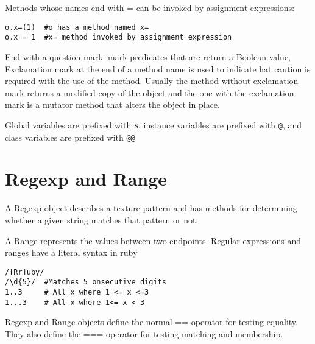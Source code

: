\documentclass[11pt, a4paper]{book}
\begin{document}
Methods whose names end with = can be invoked by assignment expressions:
\begin{verbatim}
o.x=(1)  #o has a method named x=
o.x = 1  #x= method invoked by assignment expression
\end{verbatim}

End with a question mark: mark predicates that are return a Boolean value,
Exclamation mark at the end of a method name is used to indicate hat caution is
required with the use of the method. Usually the method without exclamation mark
returns a modified copy of the object and the one with the exclamation mark is a
mutator method that alters the object in place. 

Global variables are prefixed with \verb|$|, instance variables are prefixed
with \verb|@|, and class variables are prefixed with \verb|@@|

\section{Regexp and Range}
A Regexp object describes a texture pattern and has methods for determining
whether a given string matches that pattern or not.

A Range represents the values between two endpoints. Regular expressions and
ranges have a literal syntax in ruby
\begin{verbatim}
/[Rr]uby/
/\d{5}/  #Matches 5 onsecutive digits
1..3     # All x where 1 <= x <=3
1...3    # All x where 1<= x < 3
\end{verbatim}
Regexp and Range objects define the normal == operator for testing equality.
They also define the === operator for testing matching and membership.
\end{document}
